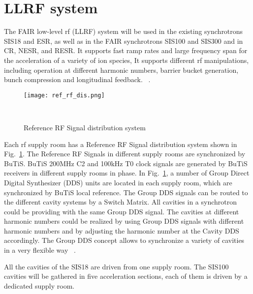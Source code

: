 \section{LLRF system}
\label{sec:LLRF}
The FAIR low-level rf (\gls{LLRF}) system will be used in the existing synchrotrons SIS18 and \gls{ESR}, as well as in the FAIR synchrotrons SIS100 and SIS300 and in \gls{CR}, \gls{NESR}, and \gls{RESR}. It supports fast ramp rates and large frequency span for the acceleration of a variety of ion species, It supports different rf manipulations, including operation at different harmonic numbers, barrier bucket generation, bunch compression and longitudinal feedback. ~\cite{klingbeil_new_2011}. 

\begin{figure}[!htb]
   \centering   
   \texttt{[image: ref\_rf\_dis.png]}
   \caption{Reference RF Signal distribution system}{~\cite{klingbeil_new_2011}}
   \label{ref_rf_dis}
\end{figure}
Each rf supply room has a Reference RF Signal distribution system shown in Fig.~\ref{ref_rf_dis}. The Reference RF Signals in different supply rooms are synchronized by BuTiS. BuTiS 200MHz C2 and 100kHz T0 clock signals are generated by BuTiS receivers in different supply rooms in phase. In Fig.~\ref{ref_rf_dis}, a number of Group Direct Digital Synthesizer (DDS) units are located in each supply room, which are synchronized by BuTiS local reference. The Group DDS signals can be routed to the different cavity systems by a Switch Matrix. All cavities in a synchrotron could be providing with the same Group DDS signal. The cavities at different harmonic numbers could be realized by using Group DDS signals with different harmonic numbers and by adjusting the harmonic number at the Cavity DDS accordingly. The Group DDS concept allows to synchronize a variety of cavities in a very flexible way ~\cite{klingbeil_new_2011}. 

All the cavities of the SIS18 are driven from one supply room. The SIS100 cavities will be gathered in five acceleration sections, each of them is driven by a dedicated supply room. 

